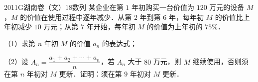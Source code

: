 
\begin{problem}{2011}{G}{湖南卷（文）}{18}{数列}
某企业在第 $1$ 年初购买一台价值为 $120$ 万元的设备 $M$，$M$ 的价值在使用过程中逐年减少．从第 $2$ 年到第 $6$ 年，每年初 $M$ 的价值比上年初减少 $10$ 万元；从第 $7$ 年开始，每年初 $M$ 的价值为上年初的 $75\%$．

（1）求第 $n$ 年初 $M$ 的价值 $a_n$ 的表达式；

（2）设 $A_n=\dfrac{a_1+a_2+\cdots+a_n}{n}$，若 $A_n$ 大于 $80$ 万元，则 $M$ 继续使用，否则须在第 $n$ 年初对 $M$ 更新．证明：须在第 $9$ 年初对 $M$ 更新．
\end{problem}

\begin{answer}

\end{answer}

\begin{solutions}

\end{solutions}